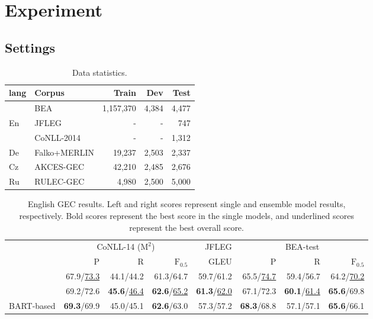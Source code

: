 \documentclass[11pt,a4paper]{article}
\begin{document}
\section{Experiment}
\subsection{Settings}

\begin{table}[t]
    \centering
    \small
    \begin{tabular}{llrrr} \toprule
        lang & Corpus & Train & Dev & Test \\ \midrule \midrule
                 & BEA & 1,157,370 & 4,384 & 4,477 \\
        En       & JFLEG & - & - & 747 \\
           & CoNLL-2014 & - & - & 1,312 \\ \midrule
        De & Falko+MERLIN & 19,237 & 2,503 & 2,337 \\ \midrule
        Cz & AKCES-GEC & 42,210 & 2,485 & 2,676 \\ \midrule
        Ru & RULEC-GEC & 4,980 & 2,500 & 5,000 \\ \bottomrule
    \end{tabular}
    \caption{Data statistics.}
    \label{gec-data}
\end{table}

\begin{table*}[t]
  \centering
  \small
  \begin{tabular}{lrrrrrrr} \toprule
      &  \multicolumn{3}{c}{CoNLL-14 ($\mathrm{M^2}$)} & JFLEG & \multicolumn{3}{c}{BEA-test} \\ \cmidrule(lr){2-4} \cmidrule(lr){5-5} \cmidrule(lr){6-8}
      & P & R & $\mathrm{F_{0.5}}$ & GLEU &  P & R & $\mathrm{F_{0.5}}$   \\ \midrule
      \citet{kiyono2019} & 67.9/\underline{73.3} & 44.1/44.2 & 61.3/64.7 & 59.7/61.2 & 65.5/\underline{74.7} & 59.4/56.7 & 64.2/\underline{70.2} \\
      \citet{kaneko_bert} & 69.2/72.6 & \textbf{45.6}/\underline{46.4} & \textbf{62.6}/\underline{65.2} & \textbf{61.3}/\underline{62.0} & 67.1/72.3 & \textbf{60.1}/\underline{61.4} & \textbf{65.6}/69.8 \\
      BART-based & \textbf{69.3}/69.9 & 45.0/45.1 & \textbf{62.6}/63.0 & 57.3/57.2 & \textbf{68.3}/68.8 & 57.1/57.1 & \textbf{65.6}/66.1 \\
      \bottomrule
  \end{tabular}
  \caption{English GEC results. Left and right scores represent single and ensemble model results, respectively. Bold scores represent the best score in the single models, and underlined scores represent the best overall score.}
  \label{result_score_english}
\end{table*}
\end{document}
